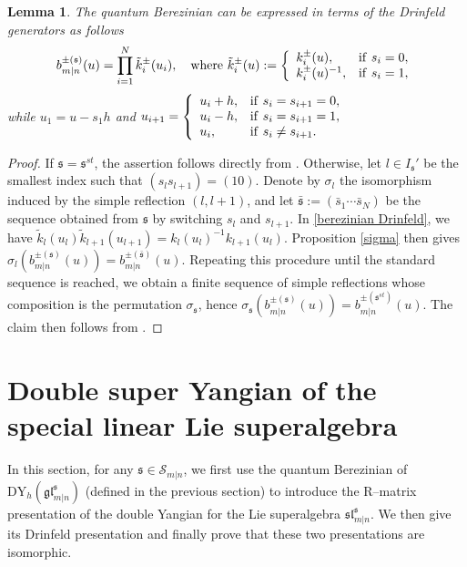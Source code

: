 \documentclass[a4paper,12pt]{article}
\newtheorem{lemm}[theo]{Lemma}
\numberwithin{equation}{section}
\begin{document}
\begin{lemm}\label{berezinian 2}
The quantum Berezinian can be expressed in terms of the Drinfeld generators as follows
\begin{align}\label{berezinian Drinfeld}
b_{m|n}^{\pm (\mathfrak{s})}(u)=\prod_{i=1}^{N}\tilde{k}_{i}^{\pm}(u_i),\quad 
 {\rm where~}
 \tilde{k}_{i}^{\pm }(u):=
\left\{\begin{array}{ll}
k_{i}^{\pm}(u),  & {\rm if~} s_{i}=0, \\
k_{i}^{\pm }(u)^{-1}, & {\rm if~} s_{i}=1,
\end{array}
\right.
\end{align}
while $u_{1}=u-s_{1}h$ and $u_{i+1}=\left\{\begin{array}{ll}
u_{i}+h, & {\rm if~} s_{i}=s_{i+1}=0, \\
 u_{i}-h, & {\rm if~} s_{i}=s_{i+1}=1, \\
 u_{i}, & {\rm if~} s_{i}\neq s_{i+1}.
\end{array}
 \right.$
\end{lemm}
\begin{proof}
If $\mathfrak{s}=\mathfrak{s}^{st}$, the assertion follows directly from \cite[Lemma 3.6]{BK25-1}. Otherwise, let $l\in I_{\mathfrak{s}}'$ be the smallest index such that $(s_{l}s_{l+1})=(10)$. Denote by $\sigma_{l}$ the isomorphism induced by the simple reflection $(l,l+1)$, and let $\bar{\mathfrak{s}}:=(\bar{s}_{1}\cdots\bar{s}_{N})$ be the sequence obtained from $\mathfrak{s}$ by switching $s_{l}$ and $s_{l+1}$. In \eqref{berezinian Drinfeld}, we have $\tilde{k}_{l}(u_{l})\tilde{k}_{l+1}(u_{l+1})=k_{l}(u_{l})^{-1}k_{l+1}(u_{l})$. Proposition \ref{sigma} then gives $\sigma_{l}(b_{m|n}^{\pm (\mathfrak{s})}(u))=b_{m|n}^{\pm (\bar{\mathfrak{s}})}(u)$. Repeating this procedure until the standard sequence is reached, we obtain a finite sequence of simple reflections whose composition is the permutation $\sigma_{\mathfrak{s}}$, hence $\sigma_{\mathfrak{s}}(b_{m|n}^{\pm (\mathfrak{s})}(u))=b_{m|n}^{\pm (\mathfrak{s}^{st})}(u)$. The claim then follows from \cite[Lemma 3.6]{BK25-1}. 
\end{proof}

\section{Double super Yangian of the special linear Lie superalgebra}

In this section, for any $\mathfrak{s}\in\mathcal{S}_{m|n}$, we first use the quantum Berezinian of $\mathrm{DY}_{h}(\mathfrak{gl}_{m|n}^{\mathfrak{s}})$ (defined in the previous section) to introduce the R--matrix presentation of the double Yangian for the Lie superalgebra $\mathfrak{sl}_{m|n}^{\mathfrak{s}}$. We then give its Drinfeld presentation and finally prove that these two presentations are isomorphic. 
\end{document}
